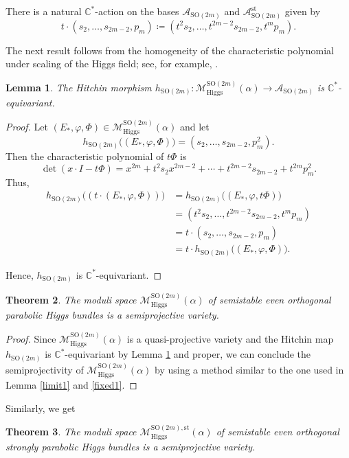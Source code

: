 \documentclass[11pt, reqno]{amsart}
\numberwithin{equation}{section}
\newtheorem{theorem}{Theorem}[section]
\newtheorem{lemma}[theorem]{Lemma}
\theoremstyle{definition}
\begin{document}
There is a natural $\mathbb{C}^*$-action on the bases $\mathcal{A}_{\mathrm{SO}(2m)}$ and $\mathcal{A}^{\mathrm{st}}_{\mathrm{SO}(2m)}$ given by 
\[
t\cdot (s_2,\dots, s_{2m-2},p_m) \coloneqq (t^2s_2, \dots, t^{2m-2}s_{2m-2}, t^mp_m).
\]

The next result follows from the homogeneity of the characteristic polynomial under scaling of the Higgs field; see, for example, \cite{H87a, GGR09}.

\begin{lemma}\label{equivariant1}
    The Hitchin morphism $h_{\mathrm{SO}(2m)} : \mathcal{M}^{\mathrm{SO}(2m)}_{\mathrm{Higgs}}(\alpha) \rightarrow \mathcal{A}_{\mathrm{SO}(2m)}$ is $\mathbb{C}^*$-equivariant.
\end{lemma}
\begin{proof}
Let $(E_*,\varphi,\Phi)\in \mathcal{M}^{\mathrm{SO}(2m)}_{\mathrm{Higgs}}(\alpha)$ and let $$h_{\mathrm{SO}(2m)}\big((E_*,\varphi,\Phi)\big) = (s_2,\dots, s_{2m-2},p_m^2).$$ Then the characteristic polynomial of $t\Phi$ is
    \[
\det(x\cdot I - t\Phi) = x^{2m} + t^2s_2x^{2m-2} + \cdots +t^{2m-2}s_{2m-2}+ t^{2m}p_m^2.
\]
Thus, 
\begin{align*}
   h_{\mathrm{SO}(2m)}\big((t\cdot (E_*,\varphi,\Phi))\big) &=h_{\mathrm{SO}(2m)}\big((E_*,\varphi,t\Phi)\big)\\ 
   &=(t^2s_2,\dots ,t^{2m-2}s_{2m-2}, t^{m}p_m) \\
   &= t\cdot (s_2,\dots ,s_{2m-2}, p_m) \\
   &= t\cdot h_{\mathrm{SO}(2m)}\big((E_*,\varphi,\Phi)\big). 
\end{align*}

Hence, $h_{\mathrm{SO}(2m)}$ is $\mathbb{C}^*$-equivariant.
\end{proof}

\begin{theorem}\label{even-orthogonal}
    The moduli space $\mathcal{M}^{\mathrm{SO}(2m)}_{\mathrm{Higgs}}(\alpha)$ of semistable even orthogonal parabolic Higgs bundles is a semiprojective variety.
\end{theorem}
\begin{proof}
    Since $\mathcal{M}^{\mathrm{SO}(2m)}_{\mathrm{Higgs}}(\alpha)$ is a quasi-projective variety and the Hitchin map $h_{\mathrm{SO}(2m)}$ is $\mathbb{C}^*$-equivariant by Lemma \ref{equivariant1} and proper, we can conclude the semiprojectivity of $\mathcal{M}^{\mathrm{SO}(2m)}_{\mathrm{Higgs}}(\alpha)$ by using a method similar to the one used in Lemma \ref{limit1} and \ref{fixed1}.
\end{proof}
Similarly, we get
\begin{theorem}
    The moduli space $\mathcal{M}^{\mathrm{SO}(2m),\mathrm{st}}_{\mathrm{Higgs}}(\alpha)$ of semistable even orthogonal strongly parabolic Higgs bundles is a semiprojective variety.
\end{theorem}
\end{document}
